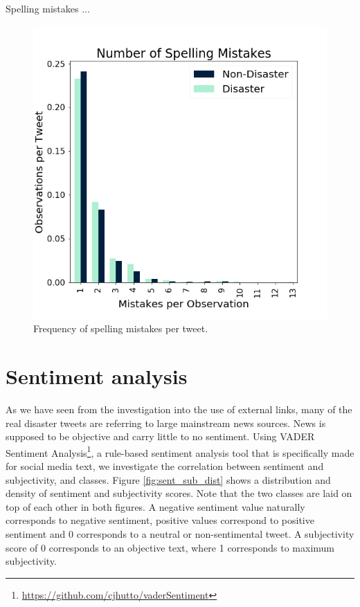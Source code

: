 \documentclass[journal, ]{IEEEtran}
\let\MYoriglatexcaption\caption
\renewcommand{\caption}[2][\relax]{\MYoriglatexcaption[#2]{#2}}
\begin{document}
Spelling mistakes ...
\begin{figure}[hbt!]
  \centering
  \includegraphics[width=0.9\linewidth]{../figures/spelling_mistakes.png}
  \caption{Frequency of spelling mistakes per tweet.}
  \label{fig:spelling_mistakes}
\end{figure}

\section{Sentiment analysis}
As we have seen from the investigation into the use of external links, many of
the real disaster tweets are referring to large mainstream news sources. News
is supposed to be objective and carry little to no sentiment. Using VADER
Sentiment Analysis\footnote{\url{https://github.com/cjhutto/vaderSentiment}}, a
rule-based sentiment analysis tool that is specifically made for social media
text, we investigate the correlation between sentiment and subjectivity, and
classes. Figure \ref{fig:sent_sub_dist} shows a distribution and density of
sentiment and subjectivity scores. Note that the two classes are laid on top of
each other in both figures. A negative sentiment value naturally corresponds to
negative sentiment, positive values correspond to positive sentiment and 0
corresponds to a neutral or non-sentimental tweet. A subjectivity score of 0
corresponds to an objective text, where 1 corresponds to maximum subjectivity.
\end{document}
